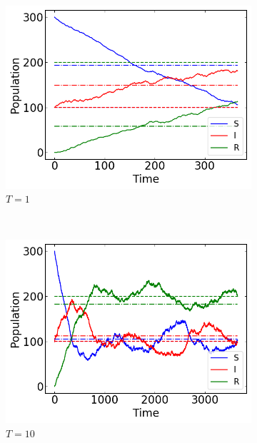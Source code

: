 \begin{figure}[H]
    \centering
    \begin{subfigure}{0.49\textwidth}
        \centering
        \includegraphics[width=\linewidth]{../fig/texfig/MC_T1.png}
        \caption{$T = 1$}
    \end{subfigure}%
     ~ 
    \begin{subfigure}{0.49\textwidth}
         \centering
         \includegraphics[width=\linewidth]{../fig/texfig/MC_T10.png}
         \caption{$T = 10$}
    \end{subfigure}
     ~ 
    \begin{subfigure}{0.49\textwidth}
         \centering

\end{subfigure}
\end{figure}
